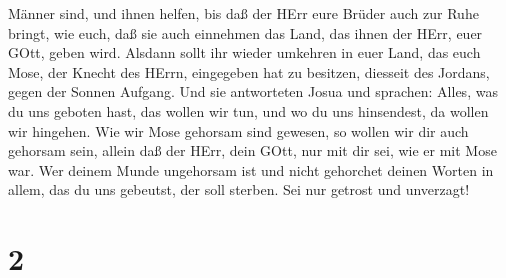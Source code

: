Männer sind, und ihnen helfen,  bis daß der HErr eure
Brüder auch zur Ruhe bringt, wie euch, daß sie auch einnehmen das Land,
das ihnen der HErr, euer GOtt, geben wird. Alsdann sollt ihr wieder
umkehren in euer Land, das euch Mose, der Knecht des HErrn, eingegeben
hat zu besitzen, diesseit des Jordans, gegen der Sonnen Aufgang.
 Und sie antworteten Josua und sprachen: Alles, was du uns
geboten hast, das wollen wir tun, und wo du uns hinsendest, da wollen
wir hingehen.  Wie wir Mose gehorsam sind gewesen, so
wollen wir dir auch gehorsam sein, allein daß der HErr, dein GOtt, nur
mit dir sei, wie er mit Mose war.  Wer deinem Munde
ungehorsam ist und nicht gehorchet deinen Worten in allem, das du uns
gebeutst, der soll sterben. Sei nur getrost und unverzagt!

\hypertarget{section-1}{%
\section{2}\label{section-1}}

